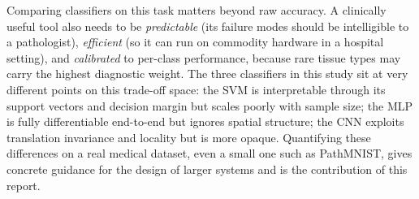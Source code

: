 \documentclass[../main.tex]{subfiles}
\begin{document}
\noindent
Comparing classifiers on this task matters beyond raw accuracy. A clinically
useful tool also needs to be \emph{predictable} (its failure modes should be
intelligible to a pathologist), \emph{efficient} (so it can run on commodity
hardware in a hospital setting), and \emph{calibrated} to per-class
performance, because rare tissue types may carry the highest diagnostic
weight. The three classifiers in this study sit at very different points on
this trade-off space: the \gls{SVM} is interpretable through its support
vectors and decision margin but scales poorly with sample size; the \gls{MLP}
is fully differentiable end-to-end but ignores spatial structure; the
\gls{CNN} exploits translation invariance and locality but is more opaque.
Quantifying these differences on a real medical dataset, even a small one
such as PathMNIST, gives concrete guidance for the design of larger systems
and is the contribution of this report.
\end{document}
